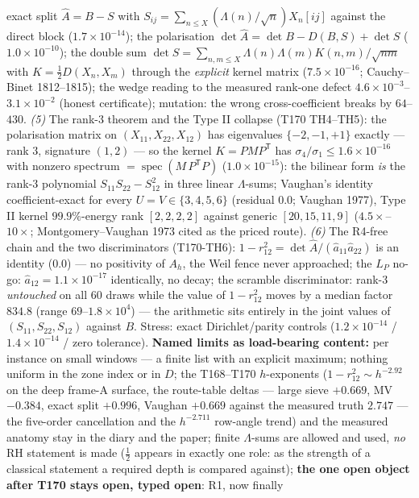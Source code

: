 \documentclass[11pt,a4paper]{article}
\begin{document}
exact split $\hat A=B-S$ with $S_{ij}=\sum_{n\le X}(\Lambda(n)/\sqrt n)
X_n[ij]$ against the direct block ($1.7\times10^{-14}$); the
polarisation $\det\hat A=\det B-D(B,S)+\det S$ ($1.0\times10^{-10}$);
the double sum $\det S=\sum_{n,m\le X}\Lambda(n)\Lambda(m)K(n,m)/
\sqrt{nm}$ with $K=\tfrac12D(X_n,X_m)$ through the \emph{explicit}
kernel matrix ($7.5\times10^{-16}$; Cauchy--Binet 1812--1815); the
wedge reading to the measured rank-one defect
$4.6\times10^{-3}$--$3.1\times10^{-2}$ (honest certificate); mutation:
the wrong cross-coefficient breaks by $64$--$430$.
\emph{(5)} The rank-3 theorem and the Type II collapse (T170 TH4--TH5):
the polarisation matrix on $(X_{11},X_{22},X_{12})$ has eigenvalues
$\{-2,-1,+1\}$ exactly --- rank $3$, signature $(1,2)$ --- so the kernel
$K=PMP^{\mathsf T}$ has $\sigma_4/\sigma_1\le1.6\times10^{-16}$ with
nonzero spectrum $=\operatorname{spec}(M\,P^{\mathsf T}P)$
($1.0\times10^{-15}$): the bilinear form \emph{is} the rank-3 polynomial
$S_{11}S_{22}-S_{12}^2$ in three linear $\Lambda$-sums; Vaughan's
identity coefficient-exact for every $U=V\in\{3,4,5,6\}$ (residual
$0.0$; Vaughan 1977), Type II kernel $99.9\%$-energy rank $[2,2,2,2]$
against generic $[20,15,11,9]$ ($4.5\times$--$10\times$;
Montgomery--Vaughan 1973 cited as the priced route).
\emph{(6)} The R4-free chain and the two discriminators (T170-TH6):
$1-r_{12}^2=\det\hat A/(\hat a_{11}\hat a_{22})$ is an identity ($0.0$)
--- no positivity of $A_h$, the Weil fence never approached; the $L_P$
no-go: $\hat a_{12}=1.1\times10^{-17}$ identically, no decay; the
scramble discriminator: rank-3 \emph{untouched} on all $60$ draws while
the value of $1-r_{12}^2$ moves by a median factor $834.8$ (range
$69$--$1.8\times10^{4}$) --- the arithmetic sits entirely in the joint
values of $(S_{11},S_{22},S_{12})$ against $B$. Stress: exact
Dirichlet/parity controls ($1.2\times10^{-14}$ / $1.4\times10^{-14}$ /
zero tolerance).
\textbf{Named limits as load-bearing content:} per instance on small
windows --- a finite list with an explicit maximum; nothing uniform in
the zone index or in $D$; the T168--T170 $h$-exponents
($1-r_{12}^2\sim h^{-2.92}$ on the deep frame-A surface, the
route-table deltas --- large sieve $+0.669$, MV $-0.384$, exact split
$+0.996$, Vaughan $+0.669$ against the measured truth $2.747$ --- the
five-order cancellation and the $h^{-2.711}$ row-angle trend) and the
measured anatomy stay in the diary and the paper; finite
$\Lambda$-sums are allowed and used, \emph{no} RH statement is made
($\tfrac12$ appears in exactly one role: as the strength of a classical
statement a required depth is compared against); \textbf{the one open
object after T170 stays open, typed open}: R1, now finally
\end{document}
